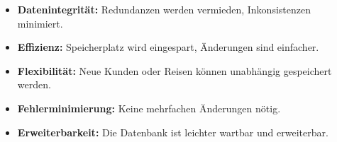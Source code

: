 \documentclass{article}
\begin{document}
	\begin{itemize}
		\item \textbf{Datenintegrität:} Redundanzen werden vermieden, Inkonsistenzen minimiert.
		\item \textbf{Effizienz:} Speicherplatz wird eingespart, Änderungen sind einfacher.
		\item \textbf{Flexibilität:} Neue Kunden oder Reisen können unabhängig gespeichert werden.
		\item \textbf{Fehlerminimierung:} Keine mehrfachen Änderungen nötig.
		\item \textbf{Erweiterbarkeit:} Die Datenbank ist leichter wartbar und erweiterbar.
	\end{itemize}
	
	
\end{document}
